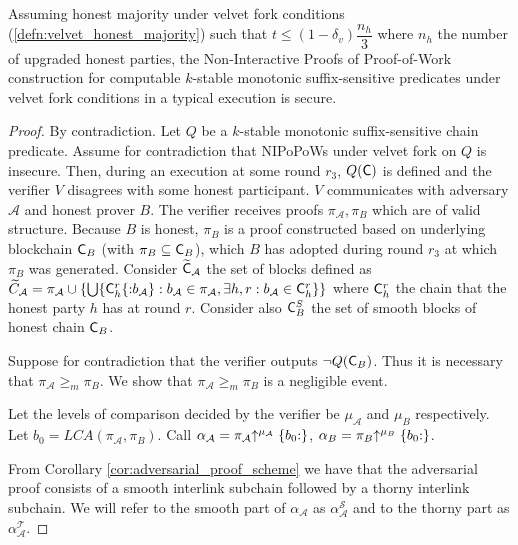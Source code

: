 \begin{theorem}
	Assuming honest majority under velvet fork conditions (\ref{defn:velvet_honest_majority}) such that $t \leq (1 - \delta_v) \dfrac{n_h}{3}$ where $n_h$ the number of upgraded honest parties, the Non-Interactive Proofs of Proof-of-Work construction for computable $k$-stable monotonic suffix-sensitive predicates under velvet fork conditions in a typical execution is secure.
\end{theorem}
\begin{proof}
By contradiction. Let $Q$ be a $k$-stable monotonic suffix-sensitive chain predicate. Assume for contradiction that NIPoPoWs under velvet fork on $Q$ is insecure. Then, during an execution at some round  $r_3$, $Q(\mathsf{C})$ is defined and the verifier $V$ disagrees with some honest participant. $V$ communicates with adversary $\mathcal{A}$ and honest prover $B$. The verifier receives proofs $\pi_\mathcal{A}, \pi_B$ which are of valid structure. Because $B$ is honest, $\pi_B$ is a proof constructed based on underlying blockchain $\mathsf{C}_B$ (with $\pi_B \subseteq \mathsf{C}_B$), which $B$ has adopted during round $r_3$ at which $\pi_B$ was generated. Consider $\widetilde{\mathsf{C}}_\mathcal{A}$ the set of blocks defined as $\widetilde{C}_\mathcal{A} = \pi_\mathcal{A} \cup \{ \bigcup \{\mathsf{C}_h^r\{{:}b_\mathcal{A}\}:  b_\mathcal{A} \in \pi_\mathcal{A}, \exists h,r : b_\mathcal{A} \in \mathsf{C}_{h}^{r}\}  \}$ where $\mathsf{C}_h^r$ the chain that the honest party $h$ has at round $r$. Consider also $\mathsf{C}^S_B$ the set of smooth blocks of honest chain $\mathsf{C}_B$.

Suppose for contradiction that the verifier outputs $\neg Q(\mathsf{C}_B)$. Thus it is necessary that $\pi_\mathcal{A} {\geq}_m \pi_B$. We show that $\pi_\mathcal{A} {\geq}_m \pi_B$ is a negligible event.

Let the levels of comparison decided by the verifier be $\mu_\mathcal{A}$ and $\mu_B$ respectively. Let $b_0 = LCA(\pi_\mathcal{A}, \pi_B)$. Call $\alpha_\mathcal{A} = \pi_\mathcal{A} \negthickspace\uparrow^{\mu_\mathcal{A}}\{b_0{:}\}$, $\alpha_B = \pi_B \negthickspace\uparrow^{\mu_B}\{b_0{:}\}$.

From Corollary \ref{cor:adversarial_proof_scheme} we have that the adversarial proof consists of a smooth interlink subchain followed by a thorny interlink subchain. We will refer to the smooth part of $\alpha_\mathcal{A}$ as $\alpha^{\mathcal{S}}_\mathcal{A}$ and to the thorny part as $\alpha^{\mathcal{T}}_\mathcal{A}$.


\end{proof}
